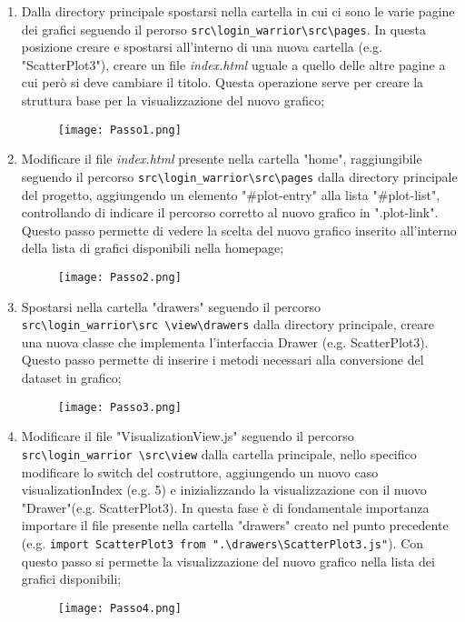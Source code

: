 \begin{enumerate}
    \item Dalla directory principale spostarsi nella cartella in cui ci sono le varie pagine dei grafici seguendo il perorso \texttt{src\textbackslash login\_warrior\textbackslash src\textbackslash pages}. In questa posizione creare e spostarsi all'interno di una nuova cartella (e.g. "ScatterPlot3"), creare un file \textit{index.html} uguale a quello delle altre pagine a cui però si deve cambiare il titolo. Questa operazione serve per creare la struttura base per la visualizzazione del nuovo grafico;
    \begin{figure}[H]
        \centering
        \texttt{[image: Passo1.png]}
      \end{figure}

    \item Modificare il file \textit{index.html} presente nella cartella "home", raggiungibile seguendo il percorso \texttt{src\textbackslash login\_warrior\textbackslash src\textbackslash pages} dalla directory principale del progetto, aggiungendo un elemento "\#plot-entry" alla lista "\#plot-list", controllando di indicare il percorso corretto al nuovo grafico in ".plot-link". Questo passo permette di vedere la scelta del nuovo grafico inserito all'interno della lista di grafici disponibili nella homepage;
    \begin{figure}[H]
        \centering
        \texttt{[image: Passo2.png]}
      \end{figure}

    \item Spostarsi nella cartella "drawers" seguendo il percorso \texttt{src\textbackslash login\_warrior\textbackslash src \textbackslash view\textbackslash drawers} dalla directory principale, creare una nuova classe che implementa l'interfaccia Drawer (e.g. ScatterPlot3). Questo passo permette di inserire i metodi necessari alla conversione del dataset in grafico;
    \begin{figure}[H]
        \centering
        \texttt{[image: Passo3.png]}
      \end{figure}

    \item Modificare il file "VisualizationView.js" seguendo il percorso \texttt{src\textbackslash login\_warrior \textbackslash src\textbackslash view} dalla cartella principale, nello specifico modificare lo switch del costruttore, aggiungendo un nuovo caso visualizationIndex (e.g. 5) e inizializzando la visualizzazione con il nuovo "Drawer"(e.g. ScatterPlot3). In questa fase è di fondamentale importanza importare il file presente nella cartella "drawers" creato nel punto precedente (e.g. \texttt{import ScatterPlot3 from ".\textbackslash drawers\textbackslash ScatterPlot3.js"}). Con questo passo si permette la visualizzazione del nuovo grafico nella lista dei grafici disponibili;
    \begin{figure}[H]
        \centering
        \texttt{[image: Passo4.png]}
      \end{figure}


\end{enumerate}
